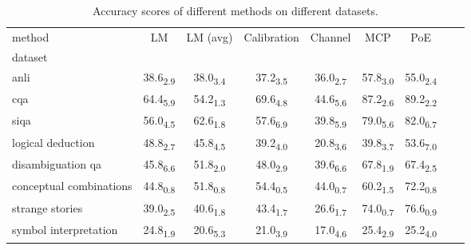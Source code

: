 \begin{table}[h]
\centering
\caption{Accuracy scores of different methods on different datasets.}
\label{tab:main_exp}
\begin{tabular}{l|c|c|c|c|c|c|c|c}
method & LM & LM (avg) & Calibration & Channel & MCP & PoE \\
dataset &  &  &  &  &  &  \\
anli & 38.6\textsubscript{2.9} & 38.0\textsubscript{3.4} & 37.2\textsubscript{3.5} & 36.0\textsubscript{2.7} & 57.8\textsubscript{3.0} & 55.0\textsubscript{2.4} \\
cqa & 64.4\textsubscript{5.9} & 54.2\textsubscript{1.3} & 69.6\textsubscript{4.8} & 44.6\textsubscript{5.6} & 87.2\textsubscript{2.6} & 89.2\textsubscript{2.2} \\
siqa & 56.0\textsubscript{4.5} & 62.6\textsubscript{1.8} & 57.6\textsubscript{6.9} & 39.8\textsubscript{5.9} & 79.0\textsubscript{5.6} & 82.0\textsubscript{6.7} \\
logical deduction & 48.8\textsubscript{2.7} & 45.8\textsubscript{4.5} & 39.2\textsubscript{4.0} & 20.8\textsubscript{3.6} & 39.8\textsubscript{3.7} & 53.6\textsubscript{7.0} \\
disambiguation qa & 45.8\textsubscript{6.6} & 51.8\textsubscript{2.0} & 48.0\textsubscript{2.9} & 39.6\textsubscript{6.6} & 67.8\textsubscript{1.9} & 67.4\textsubscript{2.5} \\
conceptual combinations & 44.8\textsubscript{0.8} & 51.8\textsubscript{0.8} & 54.4\textsubscript{0.5} & 44.0\textsubscript{0.7} & 60.2\textsubscript{1.5} & 72.2\textsubscript{0.8} \\
strange stories & 39.0\textsubscript{2.5} & 40.6\textsubscript{1.8} & 43.4\textsubscript{1.7} & 26.6\textsubscript{1.7} & 74.0\textsubscript{0.7} & 76.6\textsubscript{0.9} \\
symbol interpretation & 24.8\textsubscript{1.9} & 20.6\textsubscript{5.3} & 21.0\textsubscript{3.9} & 17.0\textsubscript{4.6} & 25.4\textsubscript{2.9} & 25.2\textsubscript{4.0} \\
\end{tabular}
\end{table}
